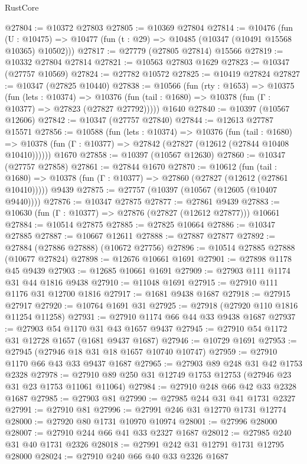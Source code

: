 \begin{lexlean}{RustCore}
\begin{coremodule}
@27804 := @10372 @27803
@27805 := @10369 @27804
@27814 := @10476
    (fun (U : @10475) => @10477 (fun (t : @29) => @10485 (@10347 (@10491 @15568 @10365) @10502)))
@27817 := @27779 (@27805 @27814) @15566
@27819 := @10332 @27804 @27814
@27821 := @10563 @27803 @1629
@27823 := @10347 (@27757 @10569)
@27824 := @27782 @10572
@27825 := @10419 @27824
@27827 := @10347 (@27825 @10440)
@27838 := @10566
    (fun (rty : @1653) =>
    @10375
      (fun (lets : @10374) =>
      @10376 (fun (tail : @1680) => @10378 (fun (Γ : @10377) => @27823 (@27827 @27792)))))
    @1640
@27840 := @10397 (@10567 @12606)
@27842 := @10347 (@27757 @27840)
@27844 := @12613 @27787 @15571
@27856 := @10588
    (fun (lets : @10374) =>
    @10376
      (fun (tail : @1680) =>
      @10378 (fun (Γ : @10377) => @27842 (@27827 (@12612 (@27844 @10408 @10410))))))
    @1670
@27858 := @10397 (@10567 @12630)
@27860 := @10347 (@27757 @27858)
@27861 := @27844 @1670
@27870 := @10612
    (fun (tail : @1680) => @10378 (fun (Γ : @10377) => @27860 (@27827 (@12612 (@27861 @10410)))))
    @9439
@27875 := @27757 (@10397 (@10567 (@12605 (@10407 @9440))))
@27876 := @10347 @27875
@27877 := @27861 @9439
@27883 := @10630 (fun (Γ : @10377) => @27876 (@27827 (@12612 @27877))) @10661
@27884 := @10514 @27875
@27885 := @27825 @10664
@27886 := @10347 @27885
@27887 := @10667 @12611
@27888 := @27887 @27877
@27892 := @27884 (@27886 @27888) (@10672 @27756)
@27896 := @10514 @27885 @27888 (@10677 @27824)
@27898 := @12676 @10661 @1691
@27901 := @27898 @1178 @45 @9439
@27903 := @12685 @10661 @1691
@27909 := @27903 @111 @1174 @31 @44 @1816 @9438
@27910 := @11048 @1691
@27915 := @27910 @111 @1176 @31 @12700 @1816
@27917 := @1681 @9438 @1687
@27918 := @27915 @27917
@27920 := @10764 @1691 @31
@27925 := @27918 (@27920 @110 @1816 @11254 @11258)
@27931 := @27910 @1174 @66 @44 @33 @9438 @1687
@27937 := @27903 @54 @1170 @31 @43 @1657 @9437
@27945 := @27910 @54 @1172 @31 @12728 @1657 (@1681 @9437 @1687)
@27946 := @10729 @1691
@27953 := @27945 (@27946 @18 @31 @18 @1657 @10740 @10747)
@27959 := @27910 @1170 @66 @43 @33 @9437 @1687
@27965 := @27903 @89 @248 @31 @42 @1753 @2328
@27978 := @27910 @89 @250 @31 @12749 @1753 @12753 (@27946 @23 @31 @23 @1753 @11061 @11064)
@27984 := @27910 @248 @66 @42 @33 @2328 @1687
@27985 := @27903 @81
@27990 := @27985 @244 @31 @41 @1731 @2327
@27991 := @27910 @81
@27996 := @27991 @246 @31 @12770 @1731 @12774
@28000 := @27920 @80 @1731 @10970 @10974
@28001 := @27996 @28000
@28007 := @27910 @244 @66 @41 @33 @2327 @1687
@28012 := @27985 @240 @31 @40 @1731 @2326
@28018 := @27991 @242 @31 @12791 @1731 @12795 @28000
@28024 := @27910 @240 @66 @40 @33 @2326 @1687

\end{coremodule}
\end{lexlean}

